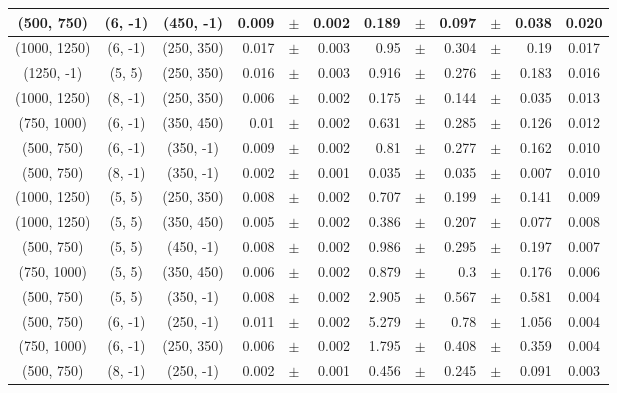 \documentclass[12pt]{paper}
\begin{document}
\begin{table}[ht]
\begin{center}
{\begin{tabular}{|c|c|c|rrr|rrrrr|c|}
(500, 750)&(6, -1)&(450, -1)&0.009&$\pm$&0.002&0.189&$\pm$&0.097&$\pm$&0.038&0.020\\\hline
(1000, 1250)&(6, -1)&(250, 350)&0.017&$\pm$&0.003&0.95&$\pm$&0.304&$\pm$&0.19&0.017\\\hline
(1250, -1)&(5, 5)&(250, 350)&0.016&$\pm$&0.003&0.916&$\pm$&0.276&$\pm$&0.183&0.016\\\hline
(1000, 1250)&(8, -1)&(250, 350)&0.006&$\pm$&0.002&0.175&$\pm$&0.144&$\pm$&0.035&0.013\\\hline
(750, 1000)&(6, -1)&(350, 450)&0.01&$\pm$&0.002&0.631&$\pm$&0.285&$\pm$&0.126&0.012\\\hline
(500, 750)&(6, -1)&(350, -1)&0.009&$\pm$&0.002&0.81&$\pm$&0.277&$\pm$&0.162&0.010\\\hline
(500, 750)&(8, -1)&(350, -1)&0.002&$\pm$&0.001&0.035&$\pm$&0.035&$\pm$&0.007&0.010\\\hline
(1000, 1250)&(5, 5)&(250, 350)&0.008&$\pm$&0.002&0.707&$\pm$&0.199&$\pm$&0.141&0.009\\\hline
(1000, 1250)&(5, 5)&(350, 450)&0.005&$\pm$&0.002&0.386&$\pm$&0.207&$\pm$&0.077&0.008\\\hline
(500, 750)&(5, 5)&(450, -1)&0.008&$\pm$&0.002&0.986&$\pm$&0.295&$\pm$&0.197&0.007\\\hline
(750, 1000)&(5, 5)&(350, 450)&0.006&$\pm$&0.002&0.879&$\pm$&0.3&$\pm$&0.176&0.006\\\hline
(500, 750)&(5, 5)&(350, -1)&0.008&$\pm$&0.002&2.905&$\pm$&0.567&$\pm$&0.581&0.004\\\hline
(500, 750)&(6, -1)&(250, -1)&0.011&$\pm$&0.002&5.279&$\pm$&0.78&$\pm$&1.056&0.004\\\hline
(750, 1000)&(6, -1)&(250, 350)&0.006&$\pm$&0.002&1.795&$\pm$&0.408&$\pm$&0.359&0.004\\\hline
(500, 750)&(8, -1)&(250, -1)&0.002&$\pm$&0.001&0.456&$\pm$&0.245&$\pm$&0.091&0.003\\\hline

\end{tabular}}
\end{center}
\end{table}
\end{document}
